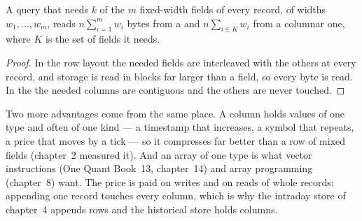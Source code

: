 \begin{omfigure}

\label{fig:pl:columnar-formats:layouts}
\end{omfigure}

\begin{proposition}\label{prop:pl:columnar-formats:scan}
A query that needs $k$ of the $m$ fixed-width fields of every record, of widths $w_1,\dots,w_m$, reads
$n\sum_{i=1}^m w_i$ bytes from a  and $n\sum_{i\in K} w_i$ from a columnar one, where $K$ is the set of
fields it needs.
\end{proposition}

\begin{proof}
In the row layout the needed fields are interleaved with the others at every record, and storage is read in blocks far larger
than a field, so every byte is read. In the  the needed columns are contiguous and the others are never touched.
\end{proof}

Two more advantages come from the same place. A column holds values of one type and often of one kind --- a timestamp that
increases, a symbol that repeats, a price that moves by a tick --- so it compresses far better than a row of mixed fields
(chapter~2 measured it). And an array of one type is what vector instructions (One Quant Book~13, chapter~14) and array
programming (chapter~8) want. The price is paid on writes and on reads of whole records: appending one record touches every
column, which is why the intraday store of chapter~4 appends rows and the historical store holds columns.

